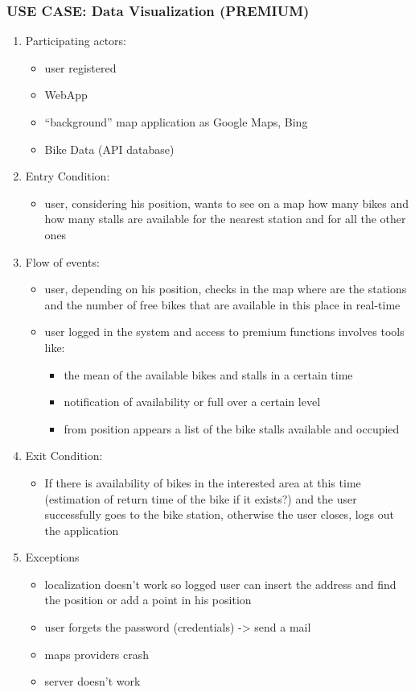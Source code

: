 \documentclass{article}
\begin{document}
\subsubsection{\textbf{USE CASE}: Data Visualization (PREMIUM)}
\begin{enumerate}
\item Participating actors: 
\begin{itemize}
    \item user registered
    \item WebApp
    \item “background” map application as Google Maps, Bing
        \item Bike Data (API database)
\end{itemize}
\item Entry Condition: 
\begin{itemize}
    \item user, considering his position, wants to see on a map how many bikes and how many stalls are available for the nearest station and for all the other ones
\end{itemize}
\item Flow of events: 
\begin{itemize}
    \item user, depending on his position, checks in the map where are the stations and the number of free bikes that are available in this place in real-time
    \item user logged in the system and access to premium functions involves tools like:
\begin{itemize}
        \item the mean of the available bikes and stalls in a certain time 
        \item notification of availability or full over a certain level
        \item from position appears a list of the bike stalls available and occupied
\end{itemize}
\end{itemize}
\item Exit Condition: 
\begin{itemize}
    \item If there is availability of bikes in the interested area at this time (estimation of return time of the bike if it exists?) and the user successfully goes to the bike station, otherwise the user closes, logs out the application
\end{itemize}
\item Exceptions
\begin{itemize}
    \item localization doesn’t work so logged user can insert the address and find the position or add a point in his position
    \item user forgets the password (credentials) -> send a mail
    \item maps providers crash
    \item server doesn’t work
\end{itemize}
\end{enumerate}
\end{document}
